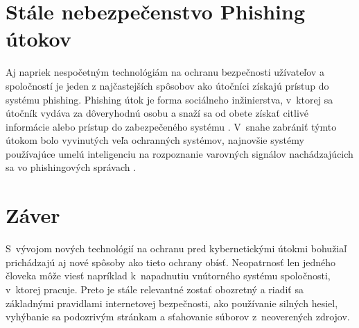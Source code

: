 \documentclass[a4paper, 11pt]{article}
\begin{document}
\section{Stále nebezpečenstvo Phishing útokov}
Aj napriek nespočetným technológiám na ochranu bezpečnosti užívateľov a spoločností je jeden z najčastejších spôsobov ako útočníci získajú prístup do systému phishing. Phishing útok je forma sociálneho inžinierstva, v~ktorej sa útočník vydáva za dôveryhodnú osobu a snaží sa od obete získať citlivé informácie alebo prístup do zabezpečeného systému \cite{Dohnal2022thesis}. V~snahe zabrániť týmto útokom bolo vyvinutých veľa ochranných systémov, najnovšie systémy používajúce umelú inteligenciu na rozpoznanie varovných signálov nachádzajúcich sa vo phishingových správach \cite{sennovate:2023}.

\section{Záver}
S~vývojom nových technológií na ochranu pred kybernetickými útokmi bohužiaľ prichádzajú aj nové spôsoby ako tieto ochrany obísť. Neopatrnosť len jedného človeka môže viesť napríklad k~napadnutiu vnútorného systému spoločnosti, v~ktorej pracuje. Preto je stále relevantné zostať obozretný a riadiť sa základnými pravidlami internetovej bezpečnosti, ako používanie silných hesiel, vyhýbanie sa podozrivým stránkam a sťahovanie súborov z~neoverených zdrojov. 


 
\end{document}
